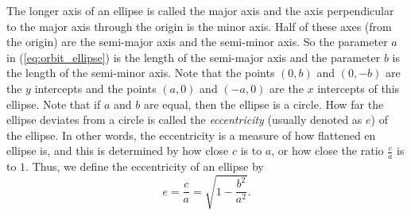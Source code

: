 The longer axis of an ellipse is called the major axis and the axis perpendicular to the major axis through the origin is the minor axis. Half of these axes (from the origin) are the semi-major axis and the  semi-minor axis. So the parameter $a$ in (\ref{eq:orbit_ellipse}) is the length of the semi-major axis and the parameter $b$ is the length of the semi-minor axis. Note that the points $(0,b)$ and $(0,-b)$ are the $y$ intercepts and the points $(a,0)$ and $(-a,0)$ are the $x$ intercepts of this ellipse. Note that if $a$ and $b$ are equal, then the ellipse is a circle. How far the ellipse deviates from a circle is called the \emph{eccentricity} (usually denoted as $e$) of the ellipse. In other words, the eccentricity is a measure of how flattened en ellipse is, and this is determined by how close $c$ is to $a$, or how close the ratio $\frac{c}{a}$ is to $1$. Thus, we define the eccentricity of an ellipse by 
\[e =\frac{c}{a} = \sqrt{1-\frac{b^2}{a^2}}.\]


